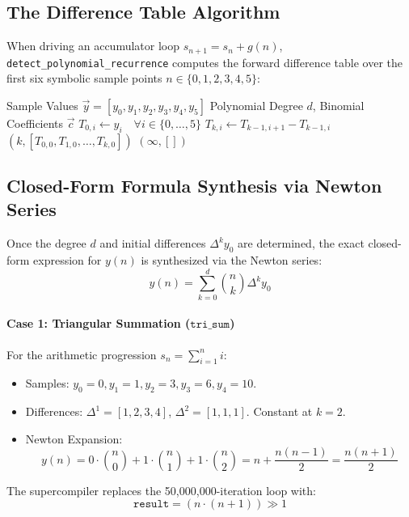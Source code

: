\subsection{The Difference Table Algorithm}
When driving an accumulator loop $s_{n+1} = s_n + g(n)$, \texttt{detect\_polynomial\_recurrence} computes the forward difference table over the first six symbolic sample points $n \in \{0, 1, 2, 3, 4, 5\}$:

\begin{algorithm}[htbp]
\caption{Forward Difference Table Construction}
\label{alg:forward_diff_table}
\begin{algorithmic}[1]
\Require Sample Values $\vec{y} = [y_0, y_1, y_2, y_3, y_4, y_5]$
\Ensure Polynomial Degree $d$, Binomial Coefficients $\vec{c}$
    \State $T_{0, i} \gets y_i \quad \forall i \in \{0, \dots, 5\}$
            \State $T_{k, i} \gets T_{k-1, i+1} - T_{k-1, i}$
        \EndFor
            \State \Return $(k, [T_{0,0}, T_{1,0}, \dots, T_{k,0}])$
        \EndIf
    \EndFor
    \State \Return $(\infty, [])$ 
\EndProcedure
\end{algorithmic}
\end{algorithm}

\subsection{Closed-Form Formula Synthesis via Newton Series}
Once the degree $d$ and initial differences $\Delta^k y_0$ are determined, the exact closed-form expression for $y(n)$ is synthesized via the Newton series:
\begin{equation}
y(n) = \sum_{k=0}^d \binom{n}{k} \Delta^k y_0
\end{equation}

\paragraph{Case 1: Triangular Summation ($\mathtt{tri\_sum}$)}
For the arithmetic progression $s_n = \sum_{i=1}^n i$:
\begin{itemize}
    \item Samples: $y_0 = 0, y_1 = 1, y_2 = 3, y_3 = 6, y_4 = 10$.
    \item Differences: $\Delta^1 = [1, 2, 3, 4]$, $\Delta^2 = [1, 1, 1]$. Constant at $k=2$.
    \item Newton Expansion:
    \begin{equation}
    y(n) = 0 \cdot \binom{n}{0} + 1 \cdot \binom{n}{1} + 1 \cdot \binom{n}{2} = n + \frac{n(n-1)}{2} = \frac{n(n+1)}{2}
    \end{equation}
\end{itemize}
The supercompiler replaces the 50,000,000-iteration loop with:
\begin{equation}
\mathtt{result} = (n \cdot (n + 1)) \gg 1
\end{equation}

